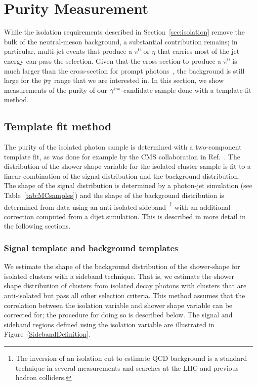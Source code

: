 \section{Purity Measurement}
\label{sec:purity}
While the isolation requirements described in Section~\ref{sec:isolation} remove the bulk of the neutral-meson background, a substantial contribution remains; in particular, multi-jet events that produce a $\pi^{0}$ or $\eta$ that carries most of the jet energy can pass the selection. Given that the cross-section to produce a $\pi^{0}$ is much larger than the cross-section for prompt photons~\cite{Arleo:2004gn}, the background is still large for the $p_{\mathrm{T}}$ range that we are interested in. In this section, we show measurements of the purity of our $\gamma^\mathrm{iso}$-candidate sample done with a template-fit method.

\subsection{Template fit method}
The purity of the isolated photon sample is determined with a two-component template fit, as was done for example by the CMS collaboration in Ref.~\cite{Sirunyan:2017qhf}. The distribution of the shower shape variable for the isolated cluster sample is fit to a linear combination of the signal distribution and the background distribution. The shape of the signal distribution is determined by a photon-jet simulation (see Table~\ref{tab:MCsamples}) and the shape of the background distribution is determined from data using an anti-isolated sideband~\footnote{The inversion of an isolation cut to estimate QCD background is a standard technique in several measurements and searches at the LHC and previous hadron colliders.} with an additional correction computed from a dijet simulation. This is described in more detail in the following sections.  

\subsubsection{Signal template and background templates }
We estimate the shape of the background distribution of the shower-shape for isolated clusters with a sideband technique. That is, we estimate the shower shape distribution of clusters from isolated decay photons with clusters that are anti-isolated but pass all other selection criteria. This method assumes that the correlation between the isolation variable and shower shape variable can be corrected for; the procedure for doing so is described below. The signal and sideband regions defined using the isolation variable are illustrated in Figure~\ref{SidebandDefinition}. 

